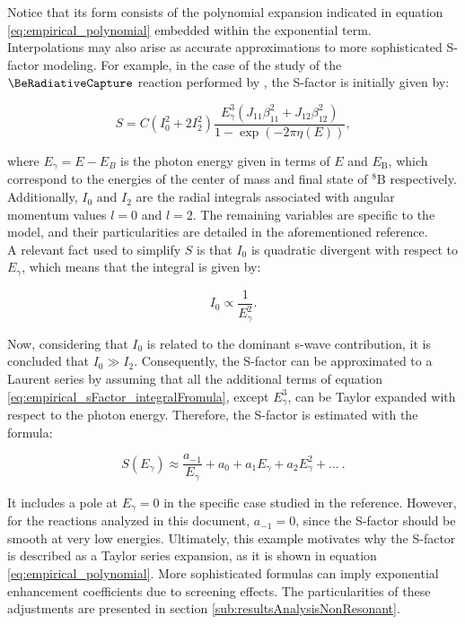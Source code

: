\documentclass[openany]{book}
\begin{document}
Notice that its form consists of the polynomial expansion indicated in equation \ref{eq:empirical_polynomial} embedded within the exponential term. \\

Interpolations may also arise as accurate approximations to more sophisticated S-factor modeling. For example, in the case of the study of the $\BeRadiativeCapture$ reaction performed by \cite{jennings_karataglidis_shoppa_1998}, the S-factor is initially given by: 

\begin{equation}\label{eq:empirical_sFactor_integralFromula}
	S = C(I^2_0 + 2I^2_2)  \frac{E^3_\gamma (J_{11}\beta^2_{11} + J_{12}\beta^2_{12})}{1 - \exp {(-2\pi \eta(E))}},
\end{equation}

where $E_\gamma = E - E_B$ is the photon energy given in terms of $E$ and $E_\mathrm{B}$, which correspond to the energies of the center of mass and final state of $\mathrm{{}^{8}B}$ respectively. Additionally, $I_0$ and $I_2$ are the radial integrals associated with angular momentum values $l=0$ and $l=2$. The remaining variables are specific to the model, and their particularities are detailed in the aforementioned reference.  \\

A relevant fact used to simplify $S$ is that $I_0$ is quadratic divergent with respect to $E_\gamma$, which means that the integral is given by:

\begin{equation}\label{eq:empirical_sFactor_integralFromula_I.0}
	I_0 \propto \frac{1}{E^2_\gamma}.
\end{equation}

Now, considering that $I_0$ is related to the dominant s-wave contribution, it is concluded that $I_0 \gg I_2$. Consequently, the S-factor can be approximated to a Laurent series by assuming that all the additional terms of equation \ref{eq:empirical_sFactor_integralFromula}, except $E^3_\gamma$, can be Taylor expanded with respect to the photon energy. Therefore, the S-factor is estimated with the formula:

\begin{equation}  \label{eq:empirical_laurent}
	S(E_\gamma) \approx \frac{ a_{-1}}{E_\gamma} + a_0 + a_1 E_\gamma+ a_2 E_\gamma^2 + ... \ .
\end{equation}

It includes a pole at $E_\gamma = 0$ in the specific case studied in the reference. However, for the reactions analyzed in this document, $a_{-1} = 0$, since the S-factor should be smooth at very low energies. Ultimately, this example motivates why the S-factor is described as a Taylor series expansion, as it is shown in equation \ref{eq:empirical_polynomial}. More sophisticated formulas can imply exponential enhancement coefficients due to screening effects. The particularities of these adjustments are presented in section \ref{sub:resultsAnalysisNonResonant}. 
\end{document}
